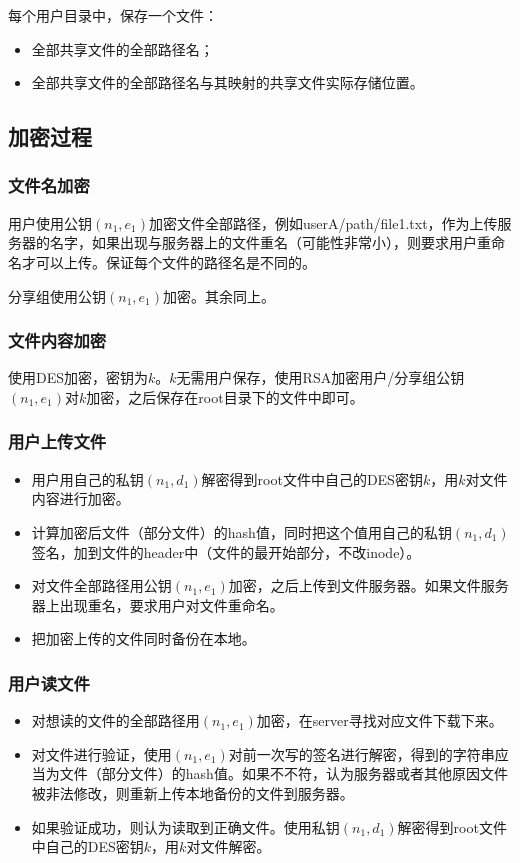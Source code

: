 \documentclass[11pt, oneside]{ctexart}
\begin{document}
每个用户目录中，保存一个文件：
\begin{itemize}
\item 全部共享文件的全部路径名；
\item 全部共享文件的全部路径名与其映射的共享文件实际存储位置。
\end{itemize}

\subsection{加密过程}
\subsubsection{文件名加密}
用户使用公钥$(n_1, e_1)$加密文件全部路径，例如userA/path/file1.txt，作为上传服务器的名字，如果出现与服务器上的文件重名（可能性非常小），则要求用户重命名才可以上传。保证每个文件的路径名是不同的。

分享组使用公钥$(n_1, e_1)$加密。其余同上。

\subsubsection{文件内容加密}
使用DES加密，密钥为$k$。$k$无需用户保存，使用RSA加密用户/分享组公钥$(n_1, e_1)$对$k$加密，之后保存在root目录下的文件中即可。

\subsubsection{用户上传文件}\label{sec:user-upload}
\begin{itemize}
\item 用户用自己的私钥$(n_1, d_1)$解密得到root文件中自己的DES密钥$k$，用$k$对文件内容进行加密。
\item 计算加密后文件（部分文件）的hash值，同时把这个值用自己的私钥$(n_1, d_1)$签名，加到文件的header中（文件的最开始部分，不改inode）。
\item 对文件全部路径用公钥$(n_1, e_1)$加密，之后上传到文件服务器。如果文件服务器上出现重名，要求用户对文件重命名。
\item 把加密上传的文件同时备份在本地。
\end{itemize}

\subsubsection{用户读文件}\label{sec:user-read}
\begin{itemize}
\item 对想读的文件的全部路径用$(n_1, e_1)$加密，在server寻找对应文件下载下来。
\item 对文件进行验证，使用$(n_1, e_1)$对前一次写的签名进行解密，得到的字符串应当为文件（部分文件）的hash值。如果不不符，认为服务器或者其他原因文件被非法修改，则重新上传本地备份的文件到服务器。
\item 如果验证成功，则认为读取到正确文件。使用私钥$(n_1, d_1)$解密得到root文件中自己的DES密钥$k$，用$k$对文件解密。
\end{itemize}
\end{document}

